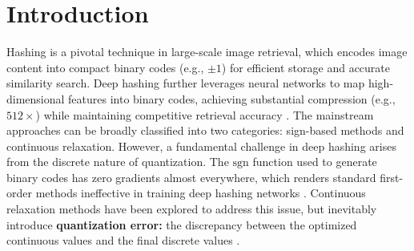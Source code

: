\section{Introduction}

\label{Section: Introduction}
Hashing is a pivotal technique in large-scale image retrieval, which encodes image content into compact binary codes (e.g., $\pm 1$) for efficient storage and accurate similarity search.
Deep hashing further leverages neural networks to map high-dimensional features into binary codes, achieving substantial compression (e.g., $512\times$) while maintaining competitive retrieval accuracy \cite{luoSurveyDeepHashing2023}. 
The mainstream approaches can be broadly classified into two categories: sign-based methods and continuous relaxation. However, a fundamental challenge in deep hashing arises from the discrete nature of quantization. The $\text{sgn}$ function used to generate binary codes has zero gradients almost everywhere, which renders standard first-order methods ineffective in training deep hashing networks \cite{Cao2017HashNetDL}. Continuous relaxation methods have been explored to address this issue, but inevitably introduce \textbf{quantization error:} the discrepancy between the optimized continuous values and the final discrete values \cite{weissSpectralHashing2008}. 
